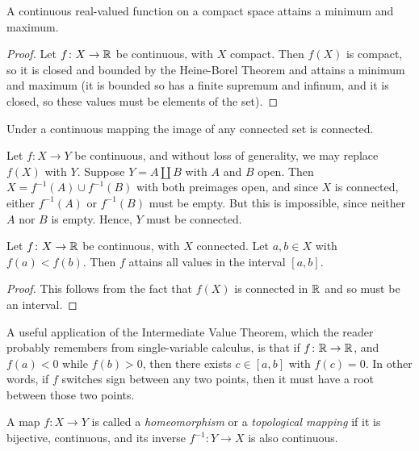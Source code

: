 \begin{theorem}
	A continuous real-valued function on a compact space attains a minimum and maximum.
\end{theorem}
\begin{proof}
	Let $f \colon X \rightarrow \mathbb R$ be continuous, with $X$ compact. Then $f(X)$ is compact, so it is closed and bounded by the Heine-Borel Theorem and attains a minimum and maximum (it is bounded so has a finite supremum and infinum, and it is closed, so these values must be elements of the set).
\end{proof}

\begin{theorem}
	Under a continuous mapping the image of any connected set is connected.
\end{theorem}
\begin{theorem}
	Let $f \colon X \rightarrow Y$ be continuous, and without loss of generality, we may replace $f(X)$ with $Y$. Suppose $Y=A \coprod B$ with $A$ and $B$ open. Then $X=f^{-1}(A) \cup f^{-1}(B)$ with both preimages open, and since $X$ is connected, either $f^{-1}(A)$ or $f^{-1}(B)$ must be empty. But this is impossible, since neither $A$ nor $B$ is empty. Hence, $Y$ must be connected.
\end{theorem}

\begin{corollary}
	Let $f \colon X \rightarrow \mathbb R$ be continuous, with $X$ connected. Let $a,b \in X$ with $f(a)<f(b)$. Then $f$ attains all values in the interval $[a,b]$.
\end{corollary}
\begin{proof}
	This follows from the fact that $f(X)$ is connected in $\mathbb R$ and so must be an interval.
\end{proof}

A useful application of the Intermediate Value Theorem, which the reader probably remembers from single-variable calculus, is that if $f \colon \mathbb R \rightarrow \mathbb R$, and $f(a)<0$ while $f(b)>0$, then there exists $c \in [a,b]$ with $f(c)=0$. In other words, if $f$ switches sign between any two points, then it must have a root between those two points.

\begin{definition}
	A map $f \colon X \rightarrow Y$ is called a \emph{homeomorphism} or a \emph{topological mapping} if it is bijective, continuous, and its inverse $f^{-1} \colon Y \rightarrow X$ is also continuous.
\end{definition}

